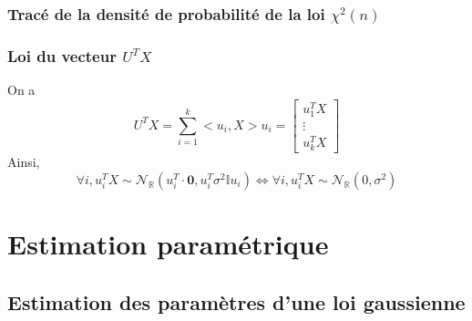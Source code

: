 \documentclass{report}
\begin{document}
		\subsection{Tracé de la densité de probabilité de la loi $\chi^2(n)$}
		\subsection{Loi du vecteur $U^TX$}
			On a
			\[ U^TX = \sum\limits_{i=1}^k <u_i, X>u_i = 
			\left[
				\begin{array}{c}
					u_1^TX \\
					\vdots \\
					u_k^TX
				\end{array}
			\right] \]
			Ainsi,
			\[ \forall i, u_i^TX \sim \mathcal{N}_\mathbb{R}(u_i^T \cdot \textbf{0}, u_i^T \sigma^2 \mathbb{I} u_i) \Leftrightarrow \forall i, u_i^TX \sim \mathcal{N}_\mathbb{R}(0, \sigma^2) \]


\chapter{Estimation paramétrique}
	\section{Estimation des paramètres d'une loi gaussienne}
\end{document}
